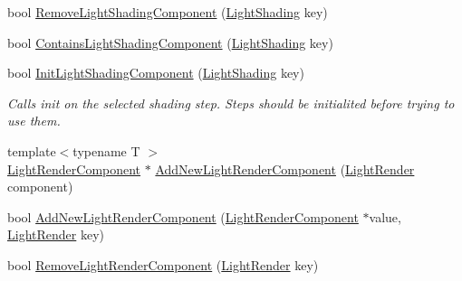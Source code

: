 \begin{DoxyCompactItemize}
\item 
bool \mbox{\hyperlink{class_geometry_engine_1_1_light_utils_1_1_light_component_manager_a56c2e68fe7eb7188d1b489f7e3ef24a0}{Remove\+Light\+Shading\+Component}} (\mbox{\hyperlink{namespace_geometry_engine_1_1_light_utils_a16eb370137c2fd151e6f8e1d07cd23e0}{Light\+Shading}} key)
\item 
bool \mbox{\hyperlink{class_geometry_engine_1_1_light_utils_1_1_light_component_manager_a453eb8a7b769afeb7b3c72489426b7b4}{Contains\+Light\+Shading\+Component}} (\mbox{\hyperlink{namespace_geometry_engine_1_1_light_utils_a16eb370137c2fd151e6f8e1d07cd23e0}{Light\+Shading}} key)
\item 
\mbox{\label{class_geometry_engine_1_1_light_utils_1_1_light_component_manager_a2c2ee1a95b3de44b815d841f5d40a321}} 
bool \mbox{\hyperlink{class_geometry_engine_1_1_light_utils_1_1_light_component_manager_a2c2ee1a95b3de44b815d841f5d40a321}{Init\+Light\+Shading\+Component}} (\mbox{\hyperlink{namespace_geometry_engine_1_1_light_utils_a16eb370137c2fd151e6f8e1d07cd23e0}{Light\+Shading}} key)
\begin{DoxyCompactList}\small\item\em Calls init on the selected shading step. Steps should be initialited before trying to use them. \end{DoxyCompactList}\item 
{\footnotesize template$<$typename T $>$ }\\\mbox{\hyperlink{class_geometry_engine_1_1_light_utils_1_1_light_render_component}{Light\+Render\+Component}} $\ast$ \mbox{\hyperlink{class_geometry_engine_1_1_light_utils_1_1_light_component_manager_a9d7a94e51a747d074c2431cec2e3b4b7}{Add\+New\+Light\+Render\+Component}} (\mbox{\hyperlink{namespace_geometry_engine_1_1_light_utils_ac3078de660742daceaa06bd9bc61d24a}{Light\+Render}} component)
\item 
bool \mbox{\hyperlink{class_geometry_engine_1_1_light_utils_1_1_light_component_manager_a94a6f31346ad67f67b8dcd8988a35fa6}{Add\+New\+Light\+Render\+Component}} (\mbox{\hyperlink{class_geometry_engine_1_1_light_utils_1_1_light_render_component}{Light\+Render\+Component}} $\ast$value, \mbox{\hyperlink{namespace_geometry_engine_1_1_light_utils_ac3078de660742daceaa06bd9bc61d24a}{Light\+Render}} key)
\item 
bool \mbox{\hyperlink{class_geometry_engine_1_1_light_utils_1_1_light_component_manager_a1d15d69445169347c1492609a427d0b4}{Remove\+Light\+Render\+Component}} (\mbox{\hyperlink{namespace_geometry_engine_1_1_light_utils_ac3078de660742daceaa06bd9bc61d24a}{Light\+Render}} key)

\end{DoxyCompactItemize}
